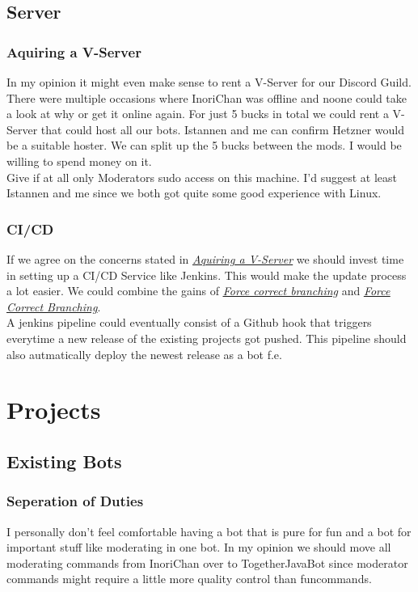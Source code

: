 \documentclass{article}
\newcommand{\refsection}[2]{\hyperref[#1]{\underline{\textit{#2}}}}
\begin{document}
    \subsection{Server}

    \subsubsection{Aquiring a V-Server}
    \label{sec:vserver}
    In my opinion it might even make sense to rent a V-Server for our Discord Guild. 
    There were multiple occasions where InoriChan was offline and noone could take a look at why or get it online again.
    For just 5 bucks in total we could rent a V-Server that could host all our bots. Istannen and me can confirm Hetzner would be a suitable hoster.
    We can split up the 5 bucks between the mods. I would be willing to spend money on it. \\
    Give if at all only Moderators sudo access on this machine. I'd suggest at least Istannen and me since we both got quite some good experience with Linux.

    \subsubsection{CI/CD}
    If we agree on the concerns stated in \hyperref[sec:vserver]{\underline{\textit{Aquiring a V-Server}}} we should invest time in setting up a CI/CD Service like Jenkins.
    This would make the update process a lot easier. We could combine the gains of \refsection{sec:forcecorrectbranching}{Force correct branching} 
    and \refsection{sec:forcepullrequests}{Force Correct Branching}. \\ 
    A jenkins pipeline could eventually consist of a Github hook that triggers everytime a new release of the existing projects got pushed. 
    This pipeline should also autmatically deploy the newest release as a bot f.e.

    \section{Projects}

    \subsection{Existing Bots}

    \subsubsection{Seperation of Duties}
    I personally don't feel comfortable having a bot that is pure for fun and a bot for important stuff like moderating in one bot. 
    In my opinion we should move all moderating commands from InoriChan over to TogetherJavaBot since moderator commands might require a little more quality control than funcommands.
\end{document}
